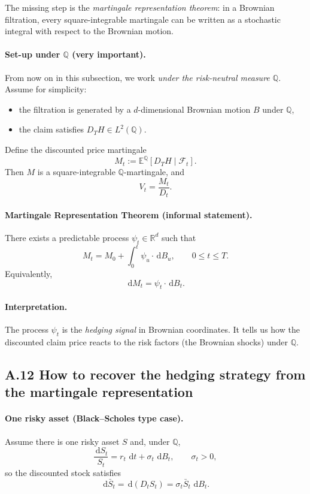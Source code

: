 \documentclass[11pt]{article}
\newcommand{\Qbb}{\mathbb{Q}}
\newcommand{\E}{\mathbb{E}}
\newcommand{\R}{\mathbb{R}}
\newcommand{\dd}{\,\mathrm{d}}
\newcommand{\1}{\mathbf{1}}
\begin{document}
The missing step is the \emph{martingale representation theorem}: in a Brownian filtration, every square-integrable martingale can be written as a stochastic integral with respect to the Brownian motion.

\paragraph{Set-up under \(\Qbb\) (very important).}
From now on in this subsection, we work \emph{under the risk-neutral measure \(\Qbb\)}.
Assume for simplicity:
\begin{itemize}[leftmargin=1.4em]
    \item the filtration is generated by a \(d\)-dimensional Brownian motion \(B\) under \(\Qbb\),
    \item the claim satisfies \(D_T H\in L^2(\Qbb)\).
\end{itemize}

Define the discounted price martingale
$$
M_t:=\E^{\Qbb}[D_T H\mid \mathcal F_t].
$$
Then \(M\) is a square-integrable \(\Qbb\)-martingale, and
$$
V_t=\frac{M_t}{D_t}.
$$

\paragraph{Martingale Representation Theorem (informal statement).}
There exists a predictable process \(\psi_t\in\R^d\) such that
$$
\boxed{\ M_t=M_0+\int_0^t \psi_u\cdot \dd B_u,\qquad 0\le t\le T. \ }
$$
Equivalently,
$$
\dd M_t=\psi_t\cdot \dd B_t.
$$

\paragraph{Interpretation.}
The process \(\psi_t\) is the \emph{hedging signal} in Brownian coordinates.
It tells us how the discounted claim price reacts to the risk factors (the Brownian shocks) under \(\Qbb\).

\subsection*{A.12 How to recover the hedging strategy from the martingale representation}

\paragraph{One risky asset (Black--Scholes type case).}
Assume there is one risky asset \(S\) and, under \(\Qbb\),
$$
\frac{\dd S_t}{S_t}=r_t\,\dd t+\sigma_t\,\dd B_t,
\qquad \sigma_t>0,
$$
so the discounted stock satisfies
$$
\dd \bar S_t = \dd(D_tS_t)=\sigma_t \bar S_t\,\dd B_t.
$$
\end{document}
